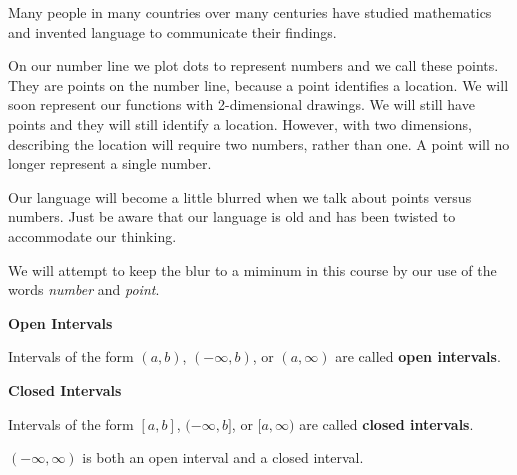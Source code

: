 \documentclass{ximera}
\begin{document}
\begin{warning}
Many people in many countries over many centuries have studied mathematics and invented language to communicate their findings.

On our number line we plot dots to represent numbers and we call these points.  They are points on the number line, because a point identifies a location.  We will soon represent our functions with 2-dimensional drawings. We will still have points and they will still identify a location.  However, with two dimensions, describing the location will require two numbers, rather than one.  A point will no longer represent a single number.

Our language will become a little blurred when we talk about points versus numbers.  Just be aware that our language is old and has been twisted to accommodate our thinking.


We will attempt to keep the blur to a miminum in this course by our use of the words \textit{number} and \textit{point}.
\end{warning}




\begin{definition} \textbf{\textcolor{green!50!black}{Open Intervals}}

Intervals of the form $(a, b)$, $(-\infty, b)$, or $(a, \infty)$ are called \textbf{open intervals}.


\end{definition}



\begin{definition} \textbf{\textcolor{green!50!black}{Closed Intervals}}

Intervals of the form $[a, b]$, $(-\infty, b]$, or $[a, \infty)$ are called \textbf{closed intervals}.


\end{definition}




\begin{warning}

$(-\infty, \infty)$ is both an open interval and a closed interval.


\end{warning}
\end{document}
